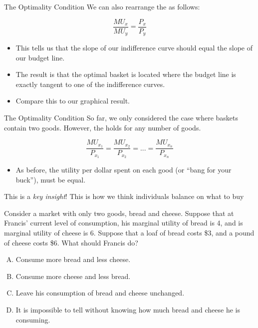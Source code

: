 \documentclass[11pt,t]{beamer}
\begin{document}
\begin{frame}{The Optimality Condition}
  We can also rearrange the  as follows:

  $$
    \frac{MU_x}{MU_y} = \frac{P_x}{P_y}
  $$

  \bigskip
  \begin{itemize}
    \item This tells us that the slope of our indifference curve should equal the slope of our budget line.
    \pause
    \item The result is that the optimal basket is located where the budget line is exactly tangent to one of the indifference curves.
    \item Compare this to our graphical result.
  \end{itemize}
\end{frame}


\begin{frame}{The Optimality Condition}
  So far, we only considered the case where baskets contain two goods. However, the  holds for any number of goods.

  $$
    \frac{MU_{x_1}}{P_{x_1}}=\frac{MU_{x_2}}{P_{x_2}}=...=\frac{MU_{x_n}}{P_{x_n}}
  $$

  \begin{itemize}
    \item As before, the utility per dollar spent on each good (or ``bang for your buck''), must be equal.
  \end{itemize}

  \pause\bigskip
  \begin{center}
    This is a \emph {key insight}! This  is how we think individuals balance  on what to buy
  \end{center}
\end{frame}

\begin{frame}

  \bigskip
  Consider a market with only two goods, bread and cheese. Suppose that at Francis' current level of consumption, his marginal utility of bread is 4, and is marginal utility of cheese is 6. Suppose that a loaf of bread costs \$3, and a pound of cheese costs \$6. What should Francis do?

  \bigskip
  \begin{enumerate}[A)]
    \item Consume more bread and less cheese.
    \item Consume more cheese and less bread.
    \item Leave his consumption of bread and cheese unchanged.
    \item It is impossible to tell without knowing how much bread and cheese he is consuming.
  \end{enumerate}
\end{frame}
\end{document}
